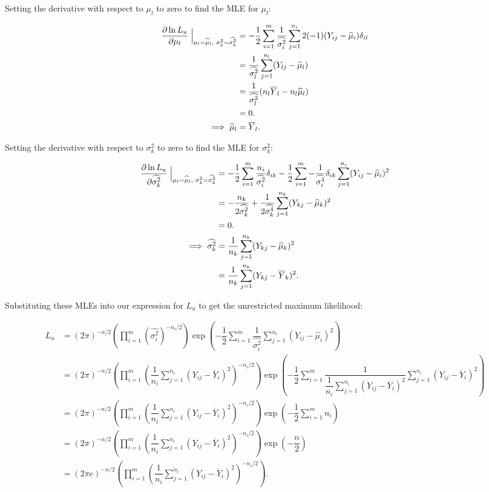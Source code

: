 \documentclass[12pt,a4paper,openright]{article}
\newcommand{\ovY}{\overline{Y}}
\newcommand{\wmu}{\widehat{\mu}}
\newcommand{\wst}[1]{\widehat{\sigma^2_#1}}
\begin{document}
	Setting the derivative with respect to $\mu_l$ to zero to find the MLE for $\mu_l$:
	
	\begin{align*}
		\dfrac{\partial \ln{L_u}}{\partial \mu_l} \Bigm\lvert_{\mu_l=\wmu_l, \hspace{0.1cm}\sigma^2_k = \wst{k}} &= -\dfrac{1}{2}\sum_{i=1}^m \dfrac{1}{\wst{i}}\sum_{j=1}^{n_i} 2(-1)(Y_{ij}-\wmu_i)\delta_{il} \\
		&= \dfrac{1}{\wst{l}} \sum_{j=1}^{n_l} (Y_{lj}-\wmu_l) \\
		&= \dfrac{1}{\wst{l}} (n_l \ovY_l  -n_l \wmu_l) \\
		&= 0. \\
		\implies \wmu_l &= \ovY_l.
	\end{align*}

	Setting the derivative with respect to $\sigma^2_k$ to zero to find the MLE for $\sigma^2_k$:
	
	\begin{align*}
		\dfrac{\partial \ln{L_u}}{\partial \wst{k}}\Bigm\lvert_{\mu_l=\wmu_l, \hspace{0.1cm}\sigma^2_k = \wst{k}} &= -\dfrac{1}{2}\sum_{i=1}^m \dfrac{n_i}{\wst{i}} \delta_{ik} - \dfrac{1}{2}\sum_{i=1}^m -\dfrac{1}{\widehat{\sigma^4_i}} \delta_{ik}\sum_{j=1}^{n_i} (Y_{ij}-\wmu_i)^2 \\
		&= -\dfrac{n_k}{2\wst{k}} + \dfrac{1}{2\widehat{\sigma^4_k}}\sum_{j=1}^{n_k} (Y_{kj}-\wmu_k)^2 \\
		&= 0. \\
		\implies \wst{k} &= \dfrac{1}{n_k} \sum_{j=1}^{n_k} (Y_{kj}-\wmu_k)^2 \\
		&= \dfrac{1}{n_k} \sum_{j=1}^{n_k} (Y_{kj}-\ovY_k)^2.
	\end{align*}

	Substituting these MLEs into our expression for $L_u$ to get the unrestricted maximum likelihood:
	
	\begin{align*}
		L_u &= (2\pi)^{-n/2} \left(\prod_{i=1}^m (\wst{i})^{-n_i/2}\right)\exp{\left(-\dfrac{1}{2}\sum_{i=1}^m \dfrac{1}{\wst{i}}\sum_{j=1}^{n_i} (Y_{ij}-\wmu_i)^2\right)} \\
		&= (2\pi)^{-n/2}\left(\prod_{i=1}^m \left(\dfrac{1}{n_i} \sum_{j=1}^{n_i} (Y_{ij}-\ovY_i)^2\right)^{-n_i/2}\right)\exp{\left(-\dfrac{1}{2}\sum_{i=1}^m \dfrac{1}{\dfrac{1}{n_i}\sum_{j=1}^{n_i} (Y_{ij}-\ovY_i)^2}\sum_{j=1}^{n_i} (Y_{ij}-\ovY_i)^2\right)} \\
		&= (2\pi)^{-n/2}\left(\prod_{i=1}^m \left(\dfrac{1}{n_i} \sum_{j=1}^{n_i} (Y_{ij}-\ovY_i)^2\right)^{-n_i/2}\right)\exp{\left(-\dfrac{1}{2}\sum_{i=1}^m n_i\right)} \\
		&= (2\pi)^{-n/2}\left(\prod_{i=1}^m \left(\dfrac{1}{n_i} \sum_{j=1}^{n_i} (Y_{ij}-\ovY_i)^2\right)^{-n_i/2}\right) \exp\left(-\dfrac{n}{2}\right) \\
		&= (2\pi e)^{-n/2}\left(\prod_{i=1}^m \left(\dfrac{1}{n_i} \sum_{j=1}^{n_i} (Y_{ij}-\ovY_i)^2\right)^{-n_i/2}\right).
	\end{align*}
\end{document}
